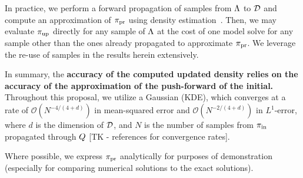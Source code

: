 In practice, we perform a forward propagation of samples from ${\Lambda}$ to $\mathcal{D}$ and compute an approximation of $\operatorname*{\pi_{pr}}$ using density estimation~\cite{BJW18}.
Then, we may evaluate $\operatorname*{\pi_{up}}$ directly for any sample of ${\Lambda}$ at the cost of one model solve for any sample other than the ones already propagated to approximate $\operatorname*{\pi_{pr}}$.
We leverage the re-use of samples in the results herein extensively.

In summary, the \textbf{accuracy of the computed updated density relies on the accuracy of the approximation of the push-forward of the initial.}
Throughout this proposal, we utilize a Gaussian (KDE), which converges at a rate of $\mathcal{O}(N^{-4/(4+d)})$ in mean-squared error and $\mathcal{O}(N^{-2/(4+d)})$ in $L^1$-error, where $d$ is the dimension of $\mathcal{D}$, and $N$ is the number of samples from $\operatorname*{\pi_{in}}$ propagated through $Q$ [TK - references for convergence rates].

%
%
%


Where possible, we express $\operatorname*{\pi_{pr}}$ analytically for purposes of demonstration (especially for comparing numerical solutions to the exact solutions).
